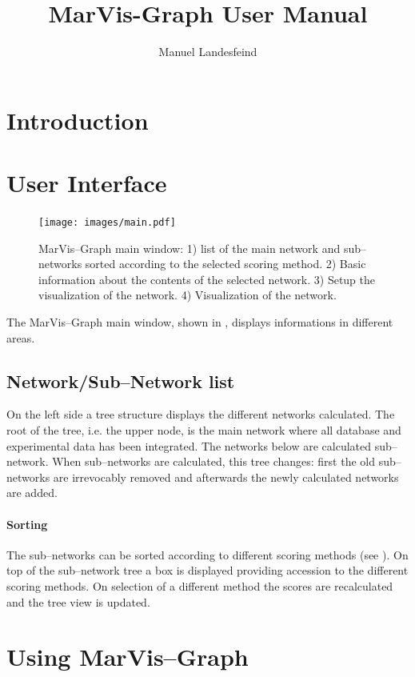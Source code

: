 \documentclass[titlepage,a4paper,twoside]{article}
\title{MarVis-Graph User Manual}
\author{Manuel Landesfeind}
\newcommand{\mg}{MarVis--Graph\xspace}
\newcommand{\pref}[1]{\prettyref{#1}}
\begin{document}
\maketitle

\section{Introduction}


\section{User Interface}

\begin{figure}
	\texttt{[image: images/main.pdf]}
	\caption[\mg main window]{\mg main window: 1) list of the main network and
		sub--networks sorted according to the selected scoring method. 2)
		Basic information about the contents of the selected network. 3) Setup
		the visualization of the network. 4) Visualization of the network.
		\label{fig:main}}
\end{figure}


The \mg main window, shown in \pref{fig:main}, displays informations in
different areas.

\subsection{Network/Sub--Network list}

On the left side a tree structure displays the different networks calculated.
The root of the tree, i.e. the upper node, is the main network where all
database and experimental data has been integrated. The networks below are
calculated sub--network. When sub--networks are calculated, this tree changes:
first the old sub--networks are irrevocably removed and afterwards the newly
calculated networks are added.

\paragraph{Sorting} The sub--networks can be sorted according to different
scoring methods (see \pref{sssec:scoring}). On top of the sub--network tree a
box is displayed providing accession to the different scoring methods. On
selection of a different method the scores are recalculated and the tree view
is updated.

\section{Using \mg}
\end{document}
